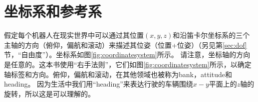 \section{坐标系和参考系}\label{sec:coordsystems}


假定每个机器人在现实世界中可以通过其位置$(x, y, z)$和沿笛卡尔坐标系的三个主轴的方向（俯仰，偏航和滚动）来描述其位姿（位置+位姿）（另见第\ref{sec:dof}节，“自由度”）。坐标系如图\ref{fig:coordinatesystem}所示。 请注意，坐标轴的方向是任意的。这本书使用“右手法则”，它们如图\ref {fig:coordinatesystem}所示，以确定轴标签和方向。俯仰，偏航和滚动，在其他领域也被称为bank，attitude和heading。   因为生活中我们用“heading”来表达行驶的车辆围绕$x-y$平面上的$z$轴的旋转，所以这是可以理解的。

